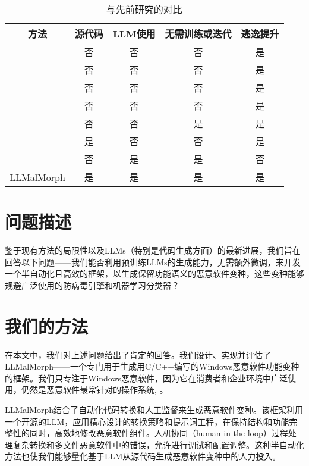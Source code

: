 \begin{table}[htbp]
	\centering
	\caption{与先前研究的对比}
	\label{tab:1.1}
	\begin{tabular*}{\textwidth}{@{\extracolsep{\fill}}ccccc}
		\toprule
		方法 & 源代码 & LLM使用 & 无需训练或迭代 & 逃逸提升 \\
		\midrule
		{\parencite{Qiao2022}} & 否 & 否 & 否 & 是 \\
		{\parencite{Digregorio2024}} & 否 & 否 & 否 & 是 \\
		{\parencite{Lucas2021}} & 否 & 否 & 否 & 是 \\
		{\parencite{Ling2024}} & 否 & 否 & 否 & 是 \\
		{\parencite{Ming2017}} & 否 & 否 & 是 & 是 \\
		{\parencite{Choi2019}} & 是 & 否 & 否 & 是 \\
        {\parencite{Botacin2023}} & 否 & 是 & 是 & 否 \\
        LLMalMorph & 是 & 是 & 是 & 是 \\
		\bottomrule
	\end{tabular*}
\end{table}

\section{问题描述}
鉴于现有方法的局限性以及LLMs（特别是代码生成方面）的最新进展，我们旨在回答以下问题——我们能否利用预训练LLMs的生成能力，无需额外微调，来开发一个半自动化且高效的框架，以生成保留功能语义的恶意软件变种，这些变种能够规避广泛使用的防病毒引擎和机器学习分类器？

\section{我们的方法}
在本文中，我们对上述问题给出了肯定的回答。我们设计、实现并评估了LLMalMorph——一个专门用于生成用C/C++编写的Windows恶意软件功能变种的框架。我们只专注于Windows恶意软件，因为它在消费者和企业环境中广泛使用，仍然是恶意软件最常针对的操作系统\parencite{AVG2024OS}, \parencite{Statcounter2024}。

LLMalMorph结合了自动化代码转换和人工监督来生成恶意软件变种。该框架利用一个开源的LLM，应用精心设计的转换策略和提示词工程，在保持结构和功能完整性的同时，高效地修改恶意软件组件。人机协同（human-in-the-loop）过程处理复杂转换和多文件恶意软件中的错误，允许进行调试和配置调整。这种半自动化方法也使我们能够量化基于LLM从源代码生成恶意软件变种中的人力投入。

